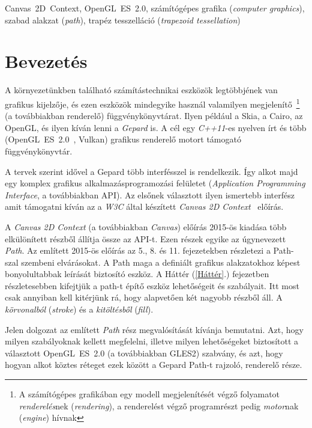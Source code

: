 \documentclass[12pt]{report}
\theoremstyle{definition}
\newcommand{\inenglish}[1]{\textsl{#1}}
\newcommand{\inenglishfn}[1]{\footnotesize{\inenglish{#1}}}
\begin{document}
 Canvas~2D~Context, OpenGL~ES~2.0, számítógépes grafika (\inenglish{computer
 graphics}), szabad alakzat (\inenglish{path}), trapéz tesszelláció
 (\inenglish{trapezoid tessellation})



    \chapter*{Bevezetés}
    \label{Bevezetés}

A környezetünkben található számítástechnikai eszközök legtöbbjének van
grafikus kijelzője, és ezen eszközök mindegyike használ valamilyen
megjelenítő~\footnote{A számítógépes grafikában egy modell megjelenítését végző
folyamatot \emph{renderelés}nek (\inenglishfn{rendering}), a renderelést végző
programrészt pedig \emph{motor}nak (\inenglishfn{engine}) hívnak} (a
továbbiakban renderelő) függvénykönyvtárat. Ilyen például a Skia, a Cairo, az
OpenGL, és ilyen kíván lenni a \emph{Gepard} is. A cél egy \emph{C++11}-es
nyelven írt és több (\mbox{OpenGL~ES~2.0 \cite{Munshi:2008:OEP:1481069}},
Vulkan) grafikus renderelő motort támogató függvénykönyvtár.

A tervek szerint idővel a Gepard több interfésszel is rendelkezik. Így alkot
majd egy komplex grafikus alkalmazásprogramozási felületet
(\inenglish{Application Programming Interface}, a továbbiakban API). Az elsőnek
választott ilyen ismertebb interfész amit támogatni kíván az a \emph{W3C} által
készített \emph{Canvas 2D Context}~\cite{Cabanier:14:HCC} előírás.

A \emph{Canvas 2D Context} (a továbbiakban \emph{Canvas}) előírás 2015-ös
kiadása több elkülönített részből állítja össze az API-t. Ezen részek egyike az
úgynevezett \emph{Path}. Az említett 2015-ös előírás az 5., 8. és 11.
fejezetekben részletezi a Path-szal szembeni elvárásokat. A Path maga a
definiált grafikus alakzatokhoz képest bonyolultabbak leírását biztosító
eszköz. A Háttér (\ref{Háttér}.) fejezetben részletesebben kifejtjük a path-t
építő eszköz lehetőségeit és szabályait. Itt most csak annyiban kell kitérjünk
rá, hogy alapvetően két nagyobb részből áll. A \emph{körvonalból}
(\inenglish{stroke}) és a \emph{kitöltésből} (\inenglish{fill}).

Jelen dolgozat az említett \emph{Path} rész megvalósítását kívánja bemutatni.
Azt, hogy milyen szabályoknak kellett megfelelni, illetve milyen lehetőségeket
biztosított a választott OpenGL~ES~2.0 (a továbbiakban GLES2) szabvány, és azt,
hogy hogyan alkot köztes réteget ezek között a Gepard Path-t rajzoló, renderelő
része.
\end{document}
